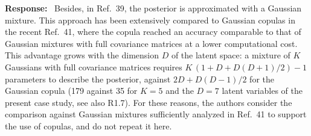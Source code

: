 \documentclass[11pt]{article}
\newenvironment{response}{\par\smallskip\noindent\color{resp}\textbf{Response:}\ }{\par}
\newcommand{\m}{\mathbf{m}}
\newcommand{\z}{\mathbf{z}}
\begin{document}
\begin{response}
Besides, in Ref.~39, the posterior is approximated with a Gaussian mixture. This approach has been extensively compared to Gaussian copulas in the recent Ref.~41, where the copula reached an accuracy comparable to that of Gaussian mixtures with full covariance matrices at a lower computational cost.	This advantage grows with the dimension $D$ of the latent space: a mixture of $K$ Gaussians with full covariance matrices requires $K\,(1+D+D(D+1)/2)-1$ parameters to describe the posterior, against $2D+D(D-1)/2$ for the Gaussian copula (179 against 35 for $K=5$ and the $D=7$ latent variables of the present case study, see also R1.7).
For these reasons, the authors consider the comparison against Gaussian mixtures sufficiently analyzed in Ref.~41 to support the use of copulas, and do not repeat it here.




\end{response}
\end{document}
